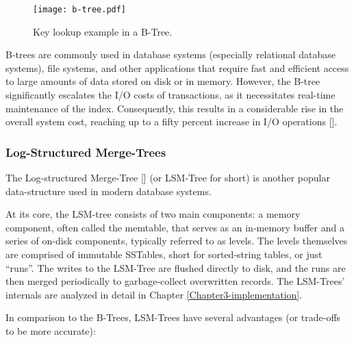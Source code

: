 \begin{figure}[h]
    \centering
    \texttt{[image: b-tree.pdf]}
    \caption{Key lookup example in a B-Tree.}
    \label{fig:b-tree}
\end{figure}

B-trees are commonly used in database systems (especially relational database systems), file systems, and other applications that require fast and efficient access to large amounts of data stored on disk or in memory. However, the B-tree significantly escalates the I/O costs of transactions, as it necessitates real-time maintenance of the index. Consequently, this results in a considerable rise in the overall system cost, reaching up to a fifty percent increase in I/O operations [\cite{lsmtree}].

\subsubsection{Log-Structured Merge-Trees}

The Log-structured Merge-Tree [\cite{lsmtree}] (or LSM-Tree for short) is another popular data-structure used in modern database systems.

At its core, the LSM-tree consists of two main components: a memory component, often called the memtable, that serves as an in-memory buffer and a series of on-disk components, typically referred to as levels. The levels themselves are comprised of immutable SSTables, short for sorted-string tables, or just ``runs''. The writes to the LSM-Tree are flushed directly to disk, and the runs are then merged periodically to garbage-collect overwritten records. The LSM-Trees' internals are analyzed in detail in Chapter \ref{Chapter3-implementation}.

In comparison to the B-Trees, LSM-Trees have several advantages (or trade-offs to be more accurate):

